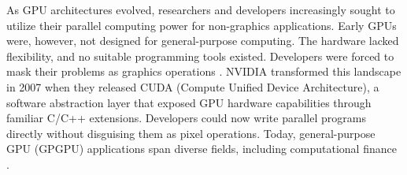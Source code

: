 \documentclass[english,12pt,a4paper,pdftex,sci,utf8]{aaltothesis}
\begin{document}
As GPU architectures evolved, researchers and developers increasingly sought to utilize their parallel computing power for non-graphics applications. Early GPUs were, however, not designed for general-purpose computing. The hardware lacked flexibility, and no suitable programming tools existed. Developers were forced to mask their problems as graphics operations \cite{sanders2010cuda, kirk2016programming}. NVIDIA transformed this landscape in 2007 when they released CUDA (Compute Unified Device Architecture), a software abstraction layer that exposed GPU hardware capabilities through familiar C/C++ extensions. Developers could now write parallel programs directly without disguising them as pixel operations. Today, general-purpose GPU (GPGPU) applications span diverse fields, including computational finance \cite{sanders2010cuda, kirk2016programming}.
\end{document}
